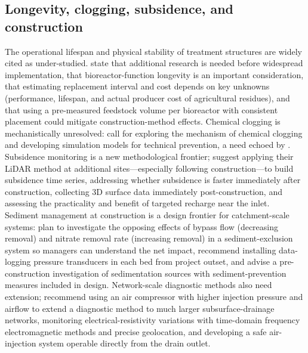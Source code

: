 \subsection{Longevity, clogging, subsidence, and construction}
The operational lifespan and physical stability of treatment structures are widely cited as under-studied. \textcite{Kohn2023} state that additional research is needed before widespread implementation, that bioreactor-function longevity is an important consideration, that estimating replacement interval and cost depends on key unknowns (performance, lifespan, and actual producer cost of agricultural residues), and that using a pre-measured feedstock volume per bioreactor with consistent placement could mitigate construction-method effects. Chemical clogging is mechanistically unresolved: \textcite{Guo2020} call for exploring the mechanism of chemical clogging and developing simulation models for technical prevention, a need echoed by \textcite{Guo2021}. Subsidence monitoring is a new methodological frontier; \textcite{Christianson2025b} suggest applying their LiDAR method at additional sites---especially following construction---to build subsidence time series, addressing whether subsidence is faster immediately after construction, collecting 3D surface data immediately post-construction, and assessing the practicality and benefit of targeted recharge near the inlet. Sediment management at construction is a design frontier for catchment-scale systems: \textcite{Feyereisen2023} plan to investigate the opposing effects of bypass flow (decreasing removal) and nitrate removal rate (increasing removal) in a sediment-exclusion system so managers can understand the net impact, recommend installing data-logging pressure transducers in each bed from project outset, and advise a pre-construction investigation of sedimentation sources with sediment-prevention measures included in design. Network-scale diagnostic methods also need extension; \textcite{Henine2021} recommend using an air compressor with higher injection pressure and airflow to extend a diagnostic method to much larger subsurface-drainage networks, monitoring electrical-resistivity variations with time-domain frequency electromagnetic methods and precise geolocation, and developing a safe air-injection system operable directly from the drain outlet.

